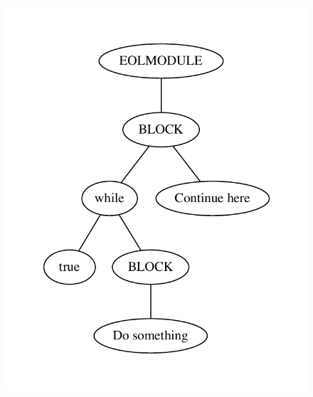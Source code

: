 \begin{figure}
\centering
\begin{minipage}{.3\textwidth}
  \centering
  
  \caption{}
  \label{lst:whileBranch}
\end{minipage}%
\begin{minipage}{.3\textwidth}
  \centering
  \includegraphics[width=\linewidth]{figures/statements/while_AST.pdf}
    \caption{}
  \label{fig:whileAST}
\end{minipage}
\begin{minipage}{.3\textwidth}
  \centering

\end{minipage}
\end{figure}
